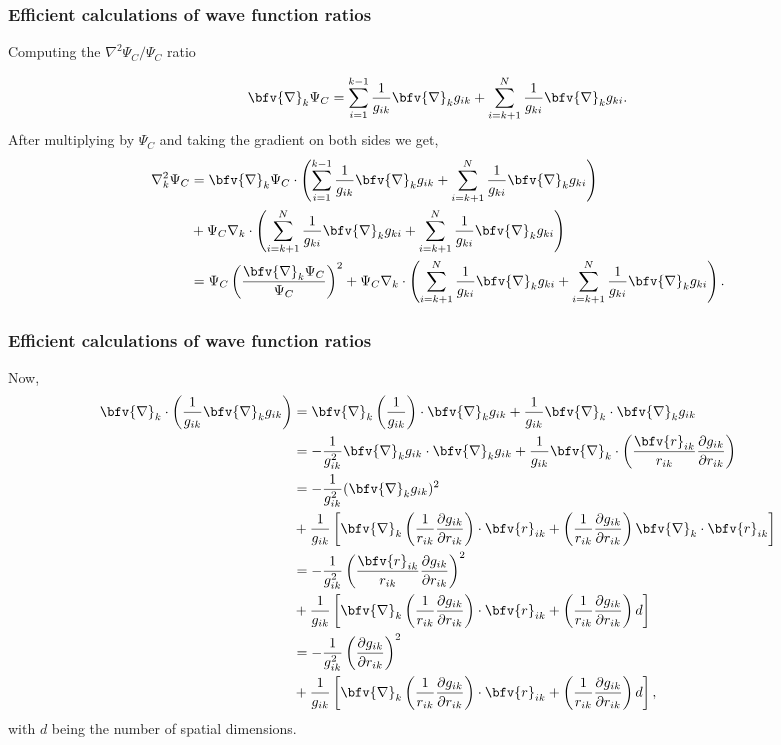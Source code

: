 \frame
 {
   \frametitle{Efficient calculations of wave function ratios}
 \begin{small}
 {\scriptsize

{Computing the $\nabla^2 \Psi_C/\Psi_C$ ratio}

\[\bfv{\nabla}_k \Psi_C = 
\sum_{i=1}^{k-1}\frac{1}{g_{ik}} \bfv{\nabla}_k g_{ik}
+
\sum_{i=k+1}^{N}\frac{1}{g_{ki}}\bfv{\nabla}_k g_{ki}.\]
After multiplying by $\Psi_C$ and taking the gradient on both sides we get,
\begin{align}\label{gradLap}
\nabla_{k}^2 \Psi_C & = \bfv{\nabla}_k \Psi_C \cdot 
\left(\sum_{i=1}^{k-1}\frac{1}{g_{ik}} \bfv{\nabla}_k g_{ik}
+
\sum_{i=k+1}^{N}\frac{1}{g_{ki}}\bfv{\nabla}_k g_{ki}\right)\nonumber\\
&+
\Psi_C \nabla_k \cdot \left(\sum_{i=k+1}^{N}\frac{1}{g_{ki}}\bfv{\nabla}_k g_{ki}
+
\sum_{i=k+1}^{N}\frac{1}{g_{ki}}\bfv{\nabla}_k g_{ki}\right)\nonumber\\
& = \Psi_C \left(\frac{\bfv{\nabla}_k \Psi_C}{\Psi_C}\right)^2 +
\Psi_C \nabla_k \cdot \left(\sum_{i=k+1}^{N}\frac{1}{g_{ki}}\bfv{\nabla}_k g_{ki}
+
\sum_{i=k+1}^{N}\frac{1}{g_{ki}}\bfv{\nabla}_k g_{ki}\right).
\end{align}
 }
 \end{small}
 }
\frame
 {
   \frametitle{Efficient calculations of wave function ratios}
 \begin{small}
 {\scriptsize

Now,
\begin{align}
 \bfv{\nabla}_k \cdot \left(\frac{1}{g_{ik}}\bfv{\nabla}_k g_{ik}\right) &= \bfv{\nabla}_k \left(\frac{1}{g_{ik}}\right)\cdot \bfv{\nabla}_k g_{ik} + \frac{1}{g_{ik}}\bfv{\nabla}_k \cdot \bfv{\nabla}_k g_{ik}\nonumber\\
 & = -\frac{1}{g_{ik}^2} \bfv{\nabla}_k g_{ik} \cdot \bfv{\nabla}_k g_{ik} + \frac{1}{g_{ik}} \bfv{\nabla}_k \cdot \left(\frac{\bfv{r}_{ik}}{r_{ik}}\frac{\partial g_{ik}}{\partial r_{ik}}\right)\nonumber\\
 & = -\frac{1}{g_{ik}^2} (\bfv{\nabla}_k g_{ik})^2 \nonumber\\&+ \frac{1}{g_{ik}}\left[\bfv{\nabla}_k \left(\frac{1}{r_{ik}}\frac{\partial g_{ik}}{\partial r_{ik}}\right)\cdot \bfv{r}_{ik} + \left(\frac{1}{r_{ik}}\frac{\partial g_{ik}}{\partial r_{ik}}\right) \bfv{\nabla}_k \cdot \bfv{r}_{ik}  \right] \nonumber\\
 &= -\frac{1}{g_{ik}^2} \left(\frac{\bfv{r}_{ik}}{r_{ik}}\frac{\partial g_{ik}}{\partial r_{ik}}\right)^2\nonumber\\ &+ \frac{1}{g_{ik}}\left[\bfv{\nabla}_k \left(\frac{1}{r_{ik}}\frac{\partial g_{ik}}{\partial r_{ik}}\right)\cdot \bfv{r}_{ik} + \left(\frac{1}{r_{ik}}\frac{\partial g_{ik}}{\partial r_{ik}}\right) d  \right]\nonumber\\
 &= -\frac{1}{g_{ik}^2} \left(\frac{\partial g_{ik}}{\partial r_{ik}}\right)^2\nonumber\\ &+ \frac{1}{g_{ik}}\left[\bfv{\nabla}_k \left(\frac{1}{r_{ik}}\frac{\partial g_{ik}}{\partial r_{ik}}\right)\cdot \bfv{r}_{ik} + \left(\frac{1}{r_{ik}}\frac{\partial g_{ik}}{\partial r_{ik}}\right) d  \right], \label{subs0}
 \end{align}
with $d$ being the number of spatial dimensions.
 }
 \end{small}
 }
